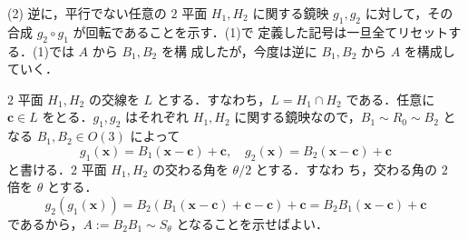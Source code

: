 \documentclass[11pt, uplatex, dvipdfmx, titlepage]{jsarticle}
\makeatletter
\DeclareMathOperator{\Fix}{Fix}
\renewenvironment{proof}[1][\proofname]{\par
  \pushQED{\qed}%
  \normalfont \topsep6\p@\@plus6\p@\relax
  \trivlist
  \item[\hskip\labelsep
         \bfseries
    {#1}]\ignorespaces
}{%
  \popQED\endtrivlist\@endpefalse
}
\theoremstyle{definition}
\renewcommand{\proofname}{\textbf{証明}}
\makeatother
\begin{document}
\begin{proof}

  \noindent
  (2) 逆に，平行でない任意の $2$ 平面 $H_1, H_2$ に関する鏡映 $g_1,
  g_2$ に対して，その合成 $g_2 \circ g_1$ が回転であることを示す．(1)で
  定義した記号は一旦全てリセットする．(1)では $A$ から $B_1, B_2$ を構
  成したが，今度は逆に $B_1, B_2$ から $A$ を構成していく．

  $2$ 平面 $H_1, H_2$ の交線を $L$ とする．すなわち，$L=H_1 \cap H_2$
  である．任意に $\bm{c} \in L$ をとる．$g_1, g_2$ はそれぞれ $H_1,
  H_2$ に関する鏡映なので，$B_1 \sim R_0 \sim B_2$ となる $B_1 , B_2
  \in O(3)$ によって
  \[
    g_1(\bm{x}) = B_1 (\bm{x}-\bm{c})+\bm{c}, \quad g_2(\bm{x}) =
    B_2(\bm{x}-\bm{c})+\bm{c}
  \]
  と書ける．$2$ 平面 $H_1, H_2$ の交わる角を $\theta/2$ とする．すなわ
  ち，交わる角の $2$ 倍を $\theta$ とする．
  \[
    g_2 ( g_1(\bm{x})) = B_2\left(B_1(\bm{x}-\bm{c})+\bm{c} - \bm{c}\right) + \bm{c} 
    = B_2 B_1(\bm{x}-\bm{c})+\bm{c}
  \]
  であるから，$A:=B_2 B_1 \sim S_{\theta}$ となることを示せばよい．


\end{proof}
\end{document}
